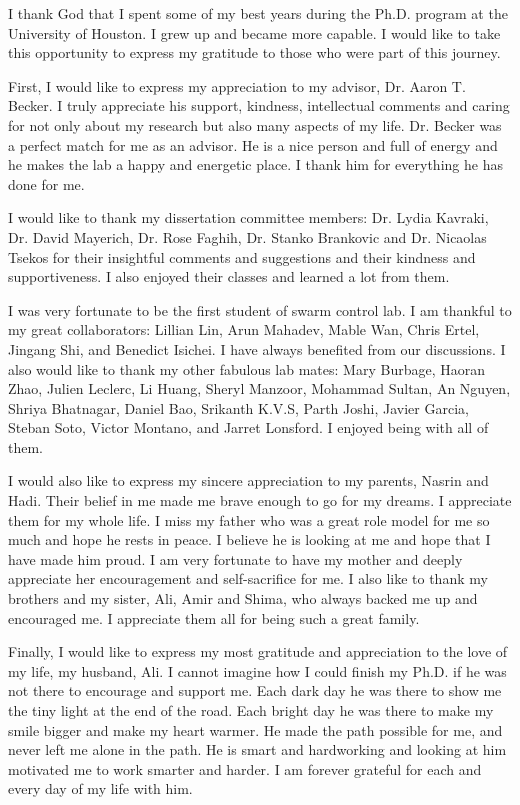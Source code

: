 



I thank God that I spent some of my best years during the Ph.D. program at the University of Houston. I grew up and became more capable. I would like to take this opportunity to express my gratitude to those who were part of this journey.

First, I would like to express my appreciation to my advisor, Dr. Aaron T. Becker. I truly appreciate his support, kindness, intellectual comments and caring for not only about my research but also many aspects of my life. Dr. Becker was a perfect match for me as an advisor. He is a nice person and full of energy and he makes the lab a happy and energetic place. I thank him for everything he has done for me.

I would like to thank my dissertation committee members: Dr. Lydia Kavraki, Dr. David Mayerich, Dr. Rose Faghih, Dr. Stanko Brankovic and Dr. Nicaolas Tsekos for their insightful comments and suggestions and their kindness and supportiveness. I also enjoyed their classes and learned a lot from them.

I was very fortunate to be the first student of swarm control lab. I am thankful to my great collaborators: Lillian Lin, Arun Mahadev, Mable Wan, Chris Ertel, Jingang Shi, and Benedict Isichei. I have always benefited from our discussions. I also would like to thank my other fabulous lab mates: Mary Burbage, Haoran Zhao, Julien Leclerc, Li Huang, Sheryl Manzoor, Mohammad Sultan, An Nguyen, Shriya Bhatnagar, Daniel Bao, Srikanth K.V.S, Parth Joshi, Javier Garcia, Steban Soto, Victor Montano, and Jarret Lonsford. I enjoyed being with all of them.

I would also like to express my sincere appreciation to my parents, Nasrin and Hadi. Their belief in me made me brave enough to go for my dreams. I appreciate them for my whole life. I miss my father who was a great role model for me so much and hope he rests in peace. I believe he is looking at me and hope that I have made him proud. I am very fortunate to have my mother and deeply appreciate her encouragement and self-sacrifice for me. I also like to thank my brothers and my sister, Ali, Amir and Shima, who always backed me up and encouraged me. I appreciate them all for being such a great family.

Finally, I would like to express my most gratitude and appreciation to the love of my life, my husband, Ali. I cannot imagine how I could finish my Ph.D. if he was not there to encourage and support me. Each dark day he was there to show me the tiny light at the end of the road. Each bright day he was there to make my smile bigger and make my heart warmer. He made the path possible for me, and never left me alone in the path. He is smart and hardworking and looking at him motivated me to work smarter and harder. I am forever grateful for each and every day of my life with him.



